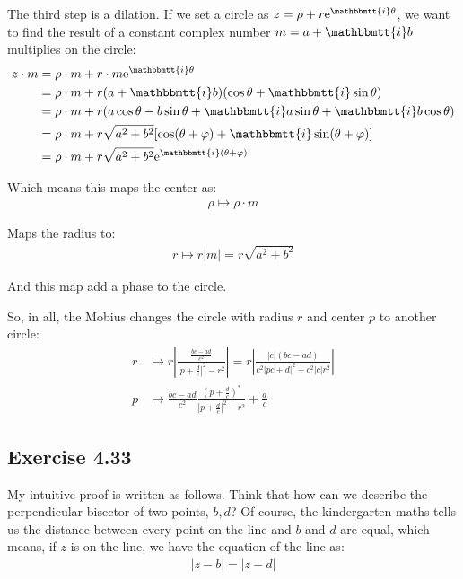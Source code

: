 \documentclass[]{ctexart}
\newcommand{\mi}{\mathbbmtt{i}}
\newcommand{\me}{\mathrm{e}}
\begin{document}
		The third step is a dilation. If we set a circle as $z=\rho+r\me^{\mi \theta}$, we want to find the result of a constant complex number $m=a+\mi b$ multiplies on the circle:
			\begin{equation*}
			\begin{aligned}
				z \cdot m &=\rho \cdot m+r \cdot m \me^{\mi \theta} \\
				&=\rho \cdot m+r(a+\mi b)(\cos \theta+\mi \sin \theta) \\
				&=\rho \cdot m+r(a\cos\theta-b \sin \theta+\mi a\sin \theta+\mi b \cos \theta) \\
				&=\rho \cdot m+r \sqrt{a^{2}+b^{2}}[\cos (\theta+\varphi)+\mi \sin (\theta+\varphi)] \\
				&=\rho \cdot m+r \sqrt{a^{2}+b^{2}} \me^{\mi(\theta+\varphi)}
			\end{aligned}
			\end{equation*}
			
		Which means this maps the center as:
			\begin{equation*}
			\begin{aligned}
				\rho\mapsto \rho\cdot m
			\end{aligned}
			\end{equation*}
		
		Maps the radius to:
			\begin{equation*}
			\begin{aligned}
				r\mapsto r|m|=r\sqrt{a^{2}+b^{2}}
			\end{aligned}
			\end{equation*}
		
		And this map add a phase to the circle. 
		
		So, in all, the Mobius changes the circle with radius $r$ and center $p$ to another circle:
			\begin{equation*}
			\begin{aligned}
				r&\mapsto r\left|\frac{\frac{bc-ad}{c^2}}{|p+\frac{d}{c}|^2-r^2}\right|=r\left|\frac{|c|(bc-ad)}{c^2|pc+d|^2-c^2|c|r^2}\right|\\
				p&\mapsto \frac{bc-ad}{c^2}\frac{\left(p+\frac{d}{c}\right)^*}{|p+\frac{d}{c}|^2-r^2}+\frac{a}{c}
			\end{aligned}
			\end{equation*}
	\subsection{Exercise 4.33}
		My intuitive proof is written as follows. Think that how can we describe the perpendicular bisector of two points, $b,d$? Of course, the kindergarten maths tells us the distance between every point on the line and $b$ and $d$ are equal, which means, if $z$ is on the line, we have the equation of the line as:
			\begin{equation*}
			\begin{aligned}
				|z-b|=|z-d|
			\end{aligned}
			\end{equation*}
			
\end{document}
